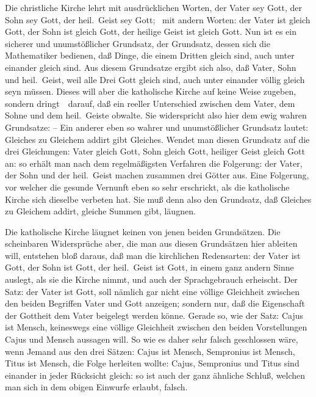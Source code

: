 Die christliche Kirche lehrt mit ausdrücklichen Worten, der Vater sey Gott, der Sohn sey Gott, der heil.\ Geist sey Gott; \dh\ mit andern Worten: der Vater ist gleich Gott, der Sohn ist gleich Gott, der heilige Geist ist gleich Gott. Nun ist es ein sicherer und unumstößlicher Grundsatz, der Grundsatz, dessen sich die Mathematiker bedienen, daß Dinge, die einem Dritten gleich sind, auch unter einander gleich sind. Aus diesem Grundsatze ergibt sich also, daß Vater, Sohn und heil.\ Geist, weil alle Drei Gott gleich sind, auch unter einander völlig gleich seyn müssen. Dieses will aber die katholische Kirche auf keine Weise zugeben, sondern dringt~\ darauf, daß ein reeller Unterschied zwischen dem Vater, dem Sohne und dem heil.\ Geiste obwalte. Sie widerspricht also hier dem ewig wahren Grundsatze:  -- Ein anderer eben so wahrer und unumstößlicher Grundsatz lautet: Gleiches zu Gleichem addirt gibt Gleiches. Wendet man diesen Grundsatz auf die drei Gleichungen: Vater gleich Gott, Sohn gleich Gott, heiliger Geist gleich Gott an: so erhält man nach dem regelmäßigsten Verfahren die Folgerung: der Vater, der Sohn und der heil.\ Geist machen zusammen drei Götter aus. Eine Folgerung, vor welcher die gesunde Vernunft eben so sehr erschrickt, als die katholische Kirche sich dieselbe verbeten hat. Sie muß denn also den Grundsatz, daß Gleiches zu Gleichem addirt, gleiche Summen gibt, läugnen.\par
{} Die katholische Kirche läugnet keinen von jenen beiden Grundsätzen. Die scheinbaren Widersprüche aber, die man aus diesen Grundsätzen hier ableiten will, entstehen bloß daraus, daß man die kirchlichen Redensarten: der Vater ist Gott, der Sohn ist Gott, der heil.\ Geist ist Gott, in einem ganz andern Sinne auslegt, als sie die Kirche nimmt, und auch der Sprachgebrauch erheischt. Der Satz: der Vater ist Gott, soll nämlich gar nicht eine völlige Gleichheit zwischen den beiden Begriffen Vater und Gott anzeigen; sondern nur, daß die Eigenschaft der Gottheit dem Vater beigelegt werden könne. Gerade so, wie der Satz: Cajus ist Mensch, keineswegs eine völlige Gleichheit zwischen den beiden Vorstellungen Cajus und Mensch aussagen will. So wie es daher sehr falsch geschlossen wäre, wenn Jemand aus den drei Sätzen: Cajus ist Mensch, Sempronius ist Mensch, Titus ist Mensch, die Folge herleiten wollte: Cajus, Sempronius und Titus sind einander in jeder Rücksicht gleich: so ist auch der ganz ähnliche Schluß, welchen man sich in dem obigen Einwurfe erlaubt, falsch.
